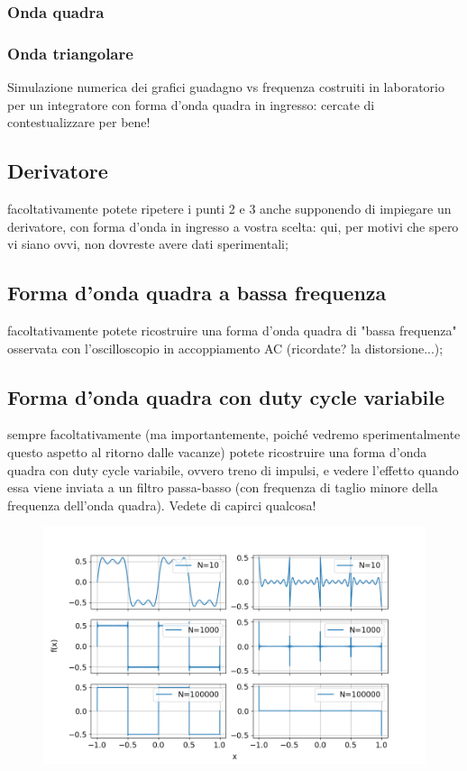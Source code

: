 \documentclass{article}
\begin{document}
\subsubsection{Onda quadra}
\subsubsection{Onda triangolare}

Simulazione numerica dei grafici guadagno vs frequenza costruiti in laboratorio 
per un integratore con forma d'onda quadra in ingresso:
 cercate di contestualizzare per bene!


\subsection{Derivatore}

facoltativamente potete ripetere i punti 2 e 3 anche supponendo di impiegare
 un derivatore, con forma d'onda in ingresso a vostra scelta: 
 qui, per motivi che spero vi siano ovvi, non dovreste avere dati sperimentali;


\subsection{Forma d'onda quadra a bassa frequenza}
facoltativamente potete ricostruire una forma d'onda quadra di "bassa frequenza"
 osservata con l'oscilloscopio in accoppiamento AC (ricordate? la distorsione...);



\subsection{Forma d'onda quadra con duty cycle variabile}
sempre facoltativamente (ma importantemente, 
poiché vedremo sperimentalmente questo aspetto al ritorno dalle vacanze) 
potete ricostruire una forma d'onda quadra con duty cycle variabile, 
ovvero treno di impulsi, e vedere l'effetto quando essa viene inviata 
a un filtro passa-basso (con frequenza di taglio minore della frequenza
 dell'onda quadra). Vedete di capirci qualcosa!


\begin{figure}[h!]
    \centering
    \includegraphics[width=1.2\textwidth]{fousquarewave.png} %
    \caption{}
    \label{fig:example}
\end{figure}
\end{document}
